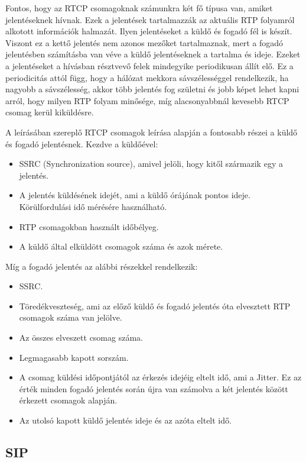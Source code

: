 Fontos, hogy az RTCP csomagoknak számunkra két fő típusa van, amiket jelentéseknek hívnak.
Ezek a jelentések tartalmazzák az aktuális RTP folyamról alkotott információk halmazát. 
Ilyen jelentéseket a küldő és fogadó fél is készít. Viszont ez a kettő jelentés 
nem azonos mezőket tartalmaznak, mert a fogadó jelentésben számításba van véve a küldő 
jelentéseknek a tartalma és ideje. Ezeket a jelentéseket a hívásban résztvevő felek 
mindegyike periodikusan állít elő. Ez a periodicitás attól függ, hogy a hálózat mekkora 
sávszélességgel rendelkezik, ha nagyobb a sávszélesség, akkor több jelentés fog születni 
és jobb képet lehet kapni arról, hogy milyen RTP folyam minősége, míg alacsonyabbnál 
kevesebb RTCP csomag kerül kiküldésre. 

A \cite{RFC3550} leírásában szereplő RTCP csomagok leírása alapján a fontosabb részei a
küldő és fogadó jelentésnek. Kezdve a küldőével: 

\begin{itemize}
	\item SSRC (Synchronization source), amivel jelöli, hogy kitől származik egy a 
	jelentés.
	\item A jelentés küldésének idejét, ami a küldő órájának pontos ideje. Körülfordulási
	idő mérésére használható. 
	\item RTP csomagokban használt időbélyeg. 
	\item A küldő által elküldött csomagok száma és azok mérete.
\end{itemize}

Míg a fogadó jelentés az alábbi részekkel rendelkezik:

\begin{itemize}
	\item SSRC.
	\item Töredékveszteség, ami az előző küldő és fogadó jelentés óta elvesztett RTP 
	csomagok száma van jelölve.
	\item Az összes elveszett csomag száma. 
	\item Legmagasabb kapott sorszám. 
	\item A csomag küldési időpontjától az érkezés idejéig eltelt idő, ami a Jitter. Ez 
	az érték minden fogadó jelentés során újra van számolva a két jelentés között 
	érkezett csomagok alapján.
	\item Az utolsó kapott küldő jelentés ideje és az azóta eltelt idő.  
\end{itemize}

\subsection{SIP}

